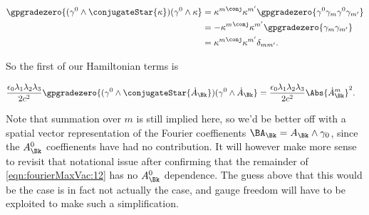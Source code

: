 \begin{align*}
\gpgradezero{ (\gamma^0 \wedge \conjugateStar{\kappa} ) (\gamma^0 \wedge \kappa } 
&=
{\kappa^m}^{\conj} \kappa^{m'}
\gpgradezero{ \gamma^0 \gamma_m \gamma^0 \gamma_{m'} } \\
&=
-{\kappa^m}^{\conj} \kappa^{m'}
\gpgradezero{ \gamma_m \gamma_{m'} }  \\
&=
{\kappa^m}^{\conj} \kappa^{m'}
\delta_{m m'}.
\end{align*}

So the first of our Hamiltonian terms is

\begin{align}\label{eqn:fourierMaxVac:13}
\frac{\epsilon_0 \lambda_1 \lambda_2 \lambda_3}{2 c^2}
\gpgradezero{ (\gamma^0 \wedge \conjugateStar{\dot{A}_\Bk} ) (\gamma^0 \wedge \dot{A}_\Bk } 
&=
\frac{\epsilon_0 \lambda_1 \lambda_2 \lambda_3}{2 c^2}
\Abs{{{\dot{A}}_{\Bk}}^m}^2.
\end{align}

Note that summation over $m$ is still implied here, so we'd be better off with a spatial vector representation of the Fourier coeffienents $\BA_\Bk = A_\Bk \wedge \gamma_0$, since the $A_\Bk^0$ coeffienents have had no contribution.  It will however make more sense to revisit that notational issue after confirming that the remainder of \ref{eqn:fourierMaxVac:12} has no $A_\Bk^0$ dependence.  The guess above that this would be the case is in fact not actually the case, and gauge freedom will have to be exploited to make such a simplification.

\EndArticle
